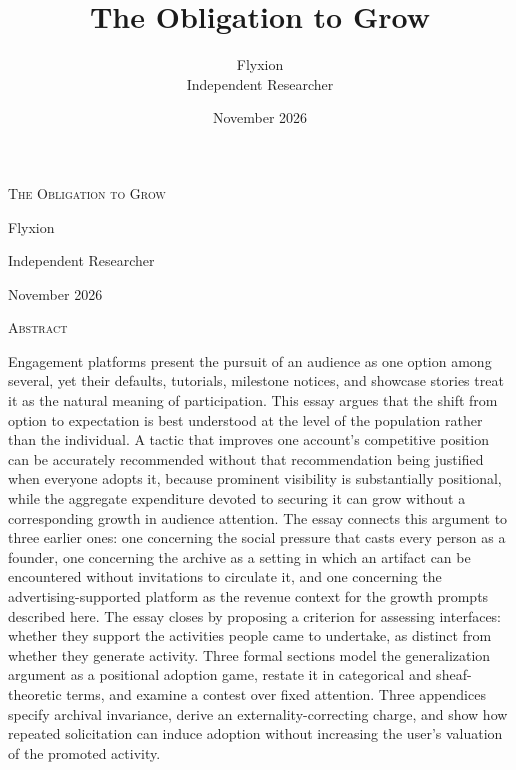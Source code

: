 \documentclass[12pt]{article}
\title{The Obligation to Grow}
\author{Flyxion\\Independent Researcher}
\date{November 2026}
\theoremstyle{plain}
\theoremstyle{definition}
\begin{document}
\begin{titlepage}
\centering
\vspace*{1.5cm}

{\LARGE\scshape The Obligation to Grow\par}

\vspace{1cm}

{\large Flyxion\par}
\vspace{0.25cm}
{\normalsize Independent Researcher\par}

\vspace{0.75cm}
{\normalsize November 2026\par}

\vfill

\begin{minipage}{0.88\textwidth}
\begin{center}
{\large\scshape Abstract}
\end{center}

\vspace{0.4cm}

{\sffamily\small
{}
\setlength{\parindent}{0pt}

Engagement platforms present the pursuit of an audience as one option among several, yet their defaults, tutorials, milestone notices, and showcase stories treat it as the natural meaning of participation. This essay argues that the shift from option to expectation is best understood at the level of the population rather than the individual. A tactic that improves one account's competitive position can be accurately recommended without that recommendation being justified when everyone adopts it, because prominent visibility is substantially positional, while the aggregate expenditure devoted to securing it can grow without a corresponding growth in audience attention. The essay connects this argument to three earlier ones: one concerning the social pressure that casts every person as a founder, one concerning the archive as a setting in which an artifact can be encountered without invitations to circulate it, and one concerning the advertising-supported platform as the revenue context for the growth prompts described here. The essay closes by proposing a criterion for assessing interfaces: whether they support the activities people came to undertake, as distinct from whether they generate activity. Three formal sections model the generalization argument as a positional adoption game, restate it in categorical and sheaf-theoretic terms, and examine a contest over fixed attention. Three appendices specify archival invariance, derive an externality-correcting charge, and show how repeated solicitation can induce adoption without increasing the user's valuation of the promoted activity.

\par}
\end{minipage}

\vfill
\vspace*{1cm}
\end{titlepage}
\end{document}
